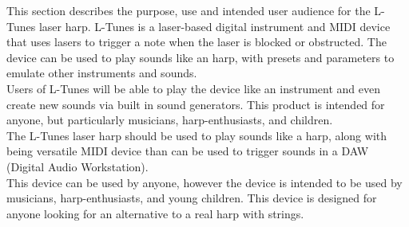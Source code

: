 This section describes the purpose, use and intended user audience for the L-Tunes laser harp. L-Tunes is a laser-based digital instrument and MIDI device that uses lasers to trigger a note when the laser is blocked or obstructed. The device can be used to play sounds like an harp, with presets and parameters to emulate other instruments and sounds. \\  
Users of L-Tunes will be able to play the device like an instrument and even create new sounds via built in sound generators.  This product is intended for anyone, but particularly musicians, harp-enthusiasts, and children.\\
The L-Tunes laser harp should be used to play sounds like a harp, along with being versatile MIDI device than can be used to trigger sounds in a DAW (Digital Audio Workstation).\\
This device can be used by anyone, however the device is intended to be used by musicians, harp-enthusiasts, and young children. This device is designed for anyone looking for an alternative to a real harp with strings.

